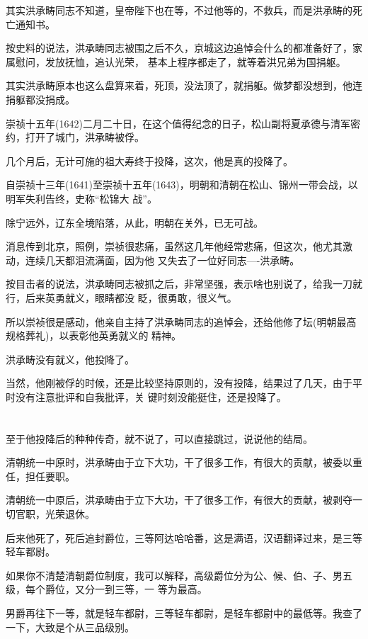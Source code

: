 \documentclass[11pt,a4paper,onecolumn]{article}
\begin{document}
其实洪承畴同志不知道，皇帝陛下也在等，不过他等的，不救兵，而是洪承畴的死亡通知书。

按史料的说法，洪承畴同志被围之后不久，京城这边追悼会什么的都准备好了，家属慰问，发放抚恤，追认光荣，
基本上程序都走了，就等着洪兄弟为国捐躯。

其实洪承畴原本也这么盘算来着，死顶，没法顶了，就捐躯。做梦都没想到，他连捐躯都没捐成。

崇祯十五年(1642)二月二十日，在这个值得纪念的日子，松山副将夏承德与清军密约，打开了城门，洪承畴被俘。

几个月后，无计可施的祖大寿终于投降，这次，他是真的投降了。

自崇祯十三年(1641)至崇祯十五年(1643)，明朝和清朝在松山、锦州一带会战，以明军失利告终，史称``松锦大
战''。

除宁远外，辽东全境陷落，从此，明朝在关外，已无可战。

消息传到北京，照例，崇祯很悲痛，虽然这几年他经常悲痛，但这次，他尤其激动，连续几天都泪流满面，因为他
又失去了一位好同志----洪承畴。

按目击者的说法，洪承畴同志被抓之后，非常坚强，表示啥也别说了，给我一刀就行，后来英勇就义，眼睛都没
眨，很勇敢，很义气。

所以崇祯很是感动，他亲自主持了洪承畴同志的追悼会，还给他修了坛(明朝最高规格葬礼)，以表彰他英勇就义的
精神。

洪承畴没有就义，他投降了。

当然，他刚被俘的时候，还是比较坚持原则的，没有投降，结果过了几天，由于平时没有注意批评和自我批评，关
键时刻没能挺住，还是投降了。

\section[\thesection]{}

至于他投降后的种种传奇，就不说了，可以直接跳过，说说他的结局。

清朝统一中原时，洪承畴由于立下大功，干了很多工作，有很大的贡献，被委以重任，担任要职。

清朝统一中原后，洪承畴由于立下大功，干了很多工作，有很大的贡献，被剥夺一切官职，光荣退休。

后来他死了，死后追封爵位，三等阿达哈哈番，这是满语，汉语翻译过来，是三等轻车都尉。

如果你不清楚清朝爵位制度，我可以解释，高级爵位分为公、候、伯、子、男五级，每个爵位，又分一到三等，一
等为最高。

男爵再往下一等，就是轻车都尉，三等轻车都尉，是轻车都尉中的最低等。我查了一下，大致是个从三品级别。
\end{document}
